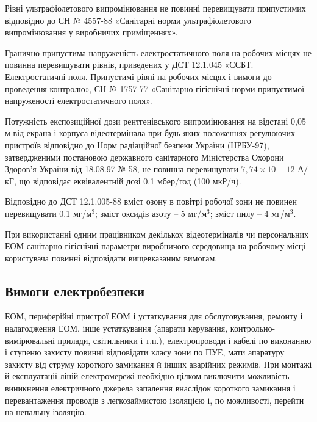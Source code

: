 \documentclass[simple,a4paper,14pt,ukrainian,utf8]{eskdtext}
\begin{document}
\begin{appendices}
                Рівні ультрафіолетового випромінювання не повинні перевищувати припустимих відповідно до СН № 4557-88 «Санітарні норми ультрафіолетового випромінювання у виробничих приміщеннях».

                Гранично припустима напруженість електростатичного поля на робочих місцях не повинна перевищувати рівнів, приведених у ДСТ 12.1.045 «ССБТ. Електростатичні поля. Припустимі рівні на робочих місцях і вимоги до проведення контролю», СН № 1757-77 «Санітарно-гігієнічні норми припустимої напруженості електростатичного поля».

                Потужність експозиційної дози рентгенівського випромінювання на відстані 0,05 м від екрана і корпуса відеотермінала при будь-яких положеннях регулюючих пристроїв відповідно до Норм радіаційної безпеки України (НРБУ-97), затвердженими постановою державного санітарного Міністерства Охорони Здоров'я України від 18.08.97 № 58, не повинна перевищувати $7,74 \times 10-12$ А/кГ, що відповідає еквівалентній дозі 0.1 мбер/год (100 мкР/ч).

                Відповідно до ДСТ 12.1.005-88 вміст озону в повітрі робочої зони не повинен перевищувати 0.1 мг/м$^{3}$; зміст оксидів азоту -- 5 мг/м$^{3}$; зміст пилу -- 4 мг/м$^{3}$.

                При використанні одним працівником декількох відеотерміналів чи персональних ЕОМ санітарно-гігієнічні параметри виробничого середовища на робочому місці користувача повинні відповідати вищевказаним вимогам.

            \subsection{Вимоги електробезпеки}

                ЕОМ, периферійні пристрої ЕОМ і устаткування для обслуговування, ремонту і налагодження ЕОМ, інше устаткування (апарати керування, контрольно-вимірювальні прилади, світильники і т.п.), електропроводи і кабелі по виконанню і ступеню захисту повинні відповідати класу зони по ПУЕ, мати апаратуру захисту від струму короткого замикання й інших аварійних режимів.
                \linebreak\linebreak
                При монтажі й експлуатації ліній електромережі необхідно цілком виключити можливість виникнення електричного джерела запалення внаслідок короткого замикання і перевантаження проводів з легкозаймистою ізоляцією і, по можливості, перейти на непальну ізоляцію.


\end{appendices}
\end{document}
